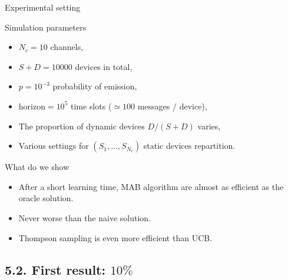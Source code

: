\documentclass[12pt,english,ignorenonframetext,aspectratio=169,]{beamer}
\providecommand{\tightlist}{%
  \setlength{\itemsep}{0pt}\setlength{\parskip}{0pt}}
\begin{document}
\begin{frame}{Experimental setting}

\begin{block}{Simulation parameters}

\begin{itemize}
\tightlist
\item
  \(N_c = 10\) channels,
\item
  \(S + D = 10000\) devices in total,
\item
  \(p = 10^{-3}\) probability of emission,
\item
  \(\text{horizon} = 10^5\) time slots (\(\simeq 100\) messages \(/\)
  device),
\item
  The proportion of dynamic devices \(D/(S+D)\) varies,
\item
  Various settings for \((S_1,\dots,S_{N_c})\) static devices
  repartition.
\end{itemize}

\end{block}

\begin{block}{What do we show}

\begin{itemize}
\tightlist
\item
  After a short learning time, MAB algorithm are almost as efficient as
  the oracle solution.
\item
  Never worse than the naive solution.
\item
  Thompson sampling is even more efficient than UCB.
\end{itemize}

\end{block}

\end{frame}



\subsection{\hfill{}5.2. First result: $10\%$\hfill{}}
\end{document}
